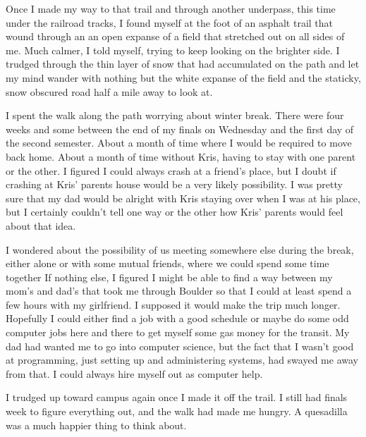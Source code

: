 Once I made my way to that trail and through another underpass, this time under the railroad tracks, I found myself at the foot of an asphalt trail that wound through an an open expanse of a field that stretched out on all sides of me.  Much calmer, I told myself, trying to keep looking on the brighter side.  I trudged through the thin layer of snow that had accumulated on the path and let my mind wander with nothing but the white expanse of the field and the staticky, snow obscured road half a mile away to look at.

I spent the walk along the path worrying about winter break.  There were four weeks and some between the end of my finals on Wednesday and the first day of the second semester.  About a month of time where I would be required to move back home.  About a month of time without Kris, having to stay with one parent or the other.  I figured I could always crash at a friend's place, but I doubt if crashing at Kris' parents house would be a very likely possibility.  I was pretty sure that my dad would be alright with Kris staying over when I was at his place, but I certainly couldn't tell one way or the other how Kris' parents would feel about that idea.

I wondered about the possibility of us meeting somewhere else during the break, either alone or with some mutual friends, where we could spend some time together  If nothing else, I figured I might be able to find a way between my mom's and dad's that took me through Boulder so that I could at least spend a few hours with my girlfriend.  I supposed it would make the trip much longer.  Hopefully I could either find a job with a good schedule or maybe do some odd computer jobs here and there to get myself some gas money for the transit.  My dad had wanted me to go into computer science, but the fact that I wasn't good at programming, just setting up and administering systems, had swayed me away from that.  I could always hire myself out as computer help.

I trudged up toward campus again once I made it off the trail.  I still had finals week to figure everything out, and the walk had made me hungry.  A quesadilla was a much happier thing to think about.
